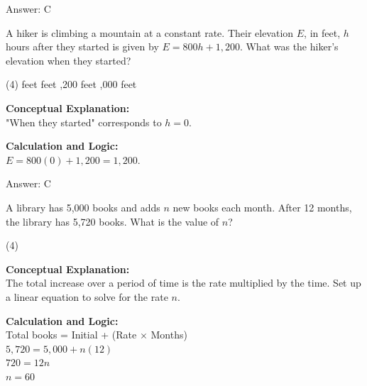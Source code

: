 \documentclass[11pt,paper=a4,answers]{exam}
\begin{document}
\begin{questions}
\begin{solution}
\vspace{15pt}
Answer: \colorbox{yellow!100}{C}
\end{solution}

\vspace{20pt}

\question
A hiker is climbing a mountain at a constant rate. Their elevation $E$, in feet, $h$ hours after they started is given by $E = 800h + 1,200$. What was the hiker’s elevation when they started?
\begin{tasks}(4)
     feet
     feet
    ,200 feet
    ,000 feet
\end{tasks}

\begin{solution}
\textbf{Conceptual Explanation:} \\
"When they started" corresponds to $h = 0$.

\vspace{10pt}
\textbf{Calculation and Logic:} \\
$E = 800(0) + 1,200 = 1,200$.

\vspace{15pt}
Answer: \colorbox{yellow!100}{C}
\end{solution}

\vspace{20pt}

\question
A library has 5,000 books and adds $n$ new books each month. After 12 months, the library has 5,720 books. What is the value of $n$?
\begin{tasks}(4)
\end{tasks}

\begin{solution}
\textbf{Conceptual Explanation:} \\
The total increase over a period of time is the rate multiplied by the time. Set up a linear equation to solve for the rate $n$.

\vspace{10pt}
\textbf{Calculation and Logic:} \\
Total books = Initial + (Rate $\times$ Months) \\
$5,720 = 5,000 + n(12)$ \\
$720 = 12n$ \\
$n = 60$


\end{solution}
\end{questions}
\end{document}
